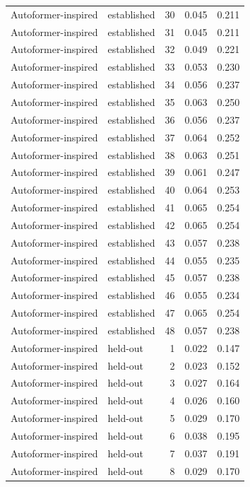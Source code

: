 \begin{tabular}{llrrr}
Autoformer-inspired & established & 30 & 0.045 & 0.211 \\
Autoformer-inspired & established & 31 & 0.045 & 0.211 \\
Autoformer-inspired & established & 32 & 0.049 & 0.221 \\
Autoformer-inspired & established & 33 & 0.053 & 0.230 \\
Autoformer-inspired & established & 34 & 0.056 & 0.237 \\
Autoformer-inspired & established & 35 & 0.063 & 0.250 \\
Autoformer-inspired & established & 36 & 0.056 & 0.237 \\
Autoformer-inspired & established & 37 & 0.064 & 0.252 \\
Autoformer-inspired & established & 38 & 0.063 & 0.251 \\
Autoformer-inspired & established & 39 & 0.061 & 0.247 \\
Autoformer-inspired & established & 40 & 0.064 & 0.253 \\
Autoformer-inspired & established & 41 & 0.065 & 0.254 \\
Autoformer-inspired & established & 42 & 0.065 & 0.254 \\
Autoformer-inspired & established & 43 & 0.057 & 0.238 \\
Autoformer-inspired & established & 44 & 0.055 & 0.235 \\
Autoformer-inspired & established & 45 & 0.057 & 0.238 \\
Autoformer-inspired & established & 46 & 0.055 & 0.234 \\
Autoformer-inspired & established & 47 & 0.065 & 0.254 \\
Autoformer-inspired & established & 48 & 0.057 & 0.238 \\
Autoformer-inspired & held-out & 1 & 0.022 & 0.147 \\
Autoformer-inspired & held-out & 2 & 0.023 & 0.152 \\
Autoformer-inspired & held-out & 3 & 0.027 & 0.164 \\
Autoformer-inspired & held-out & 4 & 0.026 & 0.160 \\
Autoformer-inspired & held-out & 5 & 0.029 & 0.170 \\
Autoformer-inspired & held-out & 6 & 0.038 & 0.195 \\
Autoformer-inspired & held-out & 7 & 0.037 & 0.191 \\
Autoformer-inspired & held-out & 8 & 0.029 & 0.170 \\

\end{tabular}

